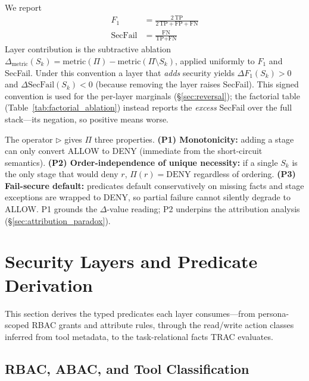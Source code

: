 \documentclass[sigconf,review,anonymous]{acmart}
\begin{document}
We report
\begin{align}
F_1 &= \frac{2\,\text{TP}}{2\,\text{TP} + \text{FP} + \text{FN}} \label{eq:f1} \\
\text{SecFail} &= \frac{\text{FN}}{\text{TP} + \text{FN}} \label{eq:secfail}
\end{align}
Layer contribution is the subtractive ablation $\Delta_{\text{metric}}(S_k)=\text{metric}(\Pi)-\text{metric}(\Pi\setminus S_k)$, applied uniformly to $F_1$ and SecFail. Under this convention a layer that \emph{adds} security yields $\Delta F_1(S_k)>0$ and $\Delta\mathrm{SecFail}(S_k)<0$ (because removing the layer raises SecFail). This signed convention is used for the per-layer marginals (\S\ref{sec:reversal}); the factorial table (Table~\ref{tab:factorial_ablation}) instead reports the \emph{excess} SecFail over the full stack---its negation, so positive means worse.

The operator $\rhd$ gives $\Pi$ three properties. \textbf{(P1) Monotonicity:} adding a stage can only convert ALLOW to DENY (immediate from the short-circuit semantics). \textbf{(P2) Order-independence of unique necessity:} if a single $S_k$ is the only stage that would deny $r$, $\Pi(r)=\mathrm{DENY}$ regardless of ordering. \textbf{(P3) Fail-secure default:} predicates default conservatively on missing facts and stage exceptions are wrapped to DENY, so partial failure cannot silently degrade to ALLOW. P1 grounds the $\Delta$-value reading; P2 underpins the attribution analysis (\S\ref{sec:attribution_paradox}).


\section{Security Layers and Predicate Derivation}
\label{sec:layers}

This section derives the typed predicates each layer consumes---from persona-scoped RBAC grants and attribute rules, through the read/write action classes inferred from tool metadata, to the task-relational facts TRAC evaluates.

\subsection{RBAC, ABAC, and Tool Classification}
\label{sec:rbac_abac_classification}
\end{document}
